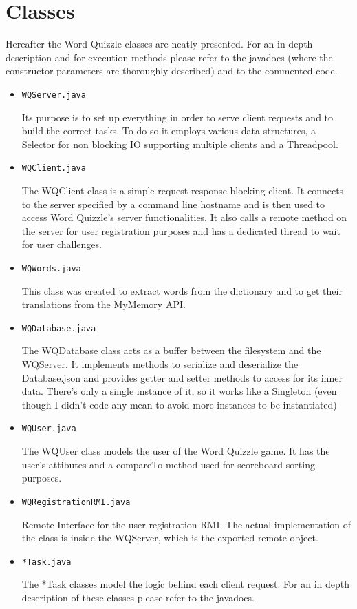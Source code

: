 \documentclass[a4paper,11pt]{article}
\begin{document}
\smallskip

\section{Classes}
Hereafter the Word Quizzle classes are neatly presented. For an in depth description and for execution methods please refer to the javadocs (where the constructor parameters are thoroughly described) and to the commented code.
\begin{itemize}
    \item \texttt{WQServer.java}
    
    Its purpose is to set up everything in order to serve client requests and to build the correct tasks. To do so it employs various data structures, a Selector for non blocking IO supporting multiple clients and a Threadpool. 
    
    \item \texttt{WQClient.java}
    
    The WQClient class is a simple request-response blocking client. It connects to the server specified by a command line hostname and is then used to access Word Quizzle's server functionalities. It also calls a remote method on the server for user registration purposes and has a dedicated thread to wait for user challenges.

    \item \texttt{WQWords.java}
    
    This class was created to extract words from the dictionary and to get their translations from the MyMemory API.
    
    \item \texttt{WQDatabase.java}
    
    The WQDatabase class acts as a buffer between the filesystem and the WQServer. It implements methods to serialize and deserialize the Database.json and provides getter and setter methods to access for its inner data.
    There's only a single instance of it, so it works like a Singleton (even though I didn't code any mean to avoid more instances to be instantiated)
    
     \item \texttt{WQUser.java}
     
     The WQUser class models the user of the Word Quizzle game. It has the user's attibutes and a compareTo method used for scoreboard sorting purposes.
     
     \item \texttt{WQRegistrationRMI.java}
     
     Remote Interface for the user registration RMI. The actual implementation of the class is inside the WQServer, which is the exported remote object.
     
     \item \texttt{*Task.java}
     
     The *Task classes model the logic behind each client request. For an in depth description of these classes please refer to the javadocs. 
    
    \end{itemize}
\end{document}
